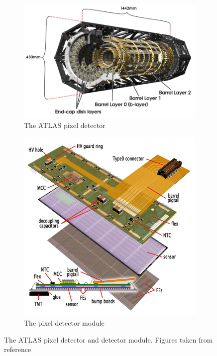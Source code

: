 \begin{figure}[h!]
     \centering
     \begin{subfigure}[b]{0.49\textwidth}
         \centering
         \includegraphics[width=\textwidth]{figures/pixel-detector.png}
         \caption{The ATLAS pixel detector}
         \label{fig:atlas-pixel}
     \end{subfigure}
     \hfill
     \begin{subfigure}[b]{0.49\textwidth}
         \centering
         \includegraphics[width=\textwidth]{figures/pixel-module.png}
         \caption{The pixel detector module}
         \label{fig:pixel-module}
     \end{subfigure}
    \caption{The ATLAS pixel detector and detector module. Figures taken from reference~\cite{ID-pixel}}
    \label{fig:pixel-detector-and-module}
\end{figure}

